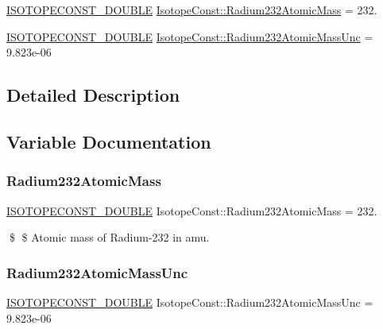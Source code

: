 \begin{DoxyCompactItemize}
\item 
\mbox{\hyperlink{group___isotope_const-_macros_ga8f45a7272ce02c0b4c65c44636ed719a}{I\+S\+O\+T\+O\+P\+E\+C\+O\+N\+S\+T\+\_\+\+D\+O\+U\+B\+LE}} \mbox{\hyperlink{group___isotope_const-_radium-_ra232_ga38102a437f0553866f7803c24a59a629}{Isotope\+Const\+::\+Radium232\+Atomic\+Mass}} = 232.
\item 
\mbox{\hyperlink{group___isotope_const-_macros_ga8f45a7272ce02c0b4c65c44636ed719a}{I\+S\+O\+T\+O\+P\+E\+C\+O\+N\+S\+T\+\_\+\+D\+O\+U\+B\+LE}} \mbox{\hyperlink{group___isotope_const-_radium-_ra232_gad67004b104bf00cbbc43ce3c08e8daec}{Isotope\+Const\+::\+Radium232\+Atomic\+Mass\+Unc}} = 9.\+823e-\/06
\end{DoxyCompactItemize}


\subsection{Detailed Description}


\subsection{Variable Documentation}
\mbox{\label{group___isotope_const-_radium-_ra232_ga38102a437f0553866f7803c24a59a629}} 
\subsubsection{\texorpdfstring{Radium232\+Atomic\+Mass}{Radium232AtomicMass}}
{\footnotesize\ttfamily \mbox{\hyperlink{group___isotope_const-_macros_ga8f45a7272ce02c0b4c65c44636ed719a}{I\+S\+O\+T\+O\+P\+E\+C\+O\+N\+S\+T\+\_\+\+D\+O\+U\+B\+LE}} Isotope\+Const\+::\+Radium232\+Atomic\+Mass = 232.}

\$ \$ Atomic mass of Radium-\/232 in amu. \mbox{\label{group___isotope_const-_radium-_ra232_gad67004b104bf00cbbc43ce3c08e8daec}} 
\subsubsection{\texorpdfstring{Radium232\+Atomic\+Mass\+Unc}{Radium232AtomicMassUnc}}
{\footnotesize\ttfamily \mbox{\hyperlink{group___isotope_const-_macros_ga8f45a7272ce02c0b4c65c44636ed719a}{I\+S\+O\+T\+O\+P\+E\+C\+O\+N\+S\+T\+\_\+\+D\+O\+U\+B\+LE}} Isotope\+Const\+::\+Radium232\+Atomic\+Mass\+Unc = 9.\+823e-\/06}

